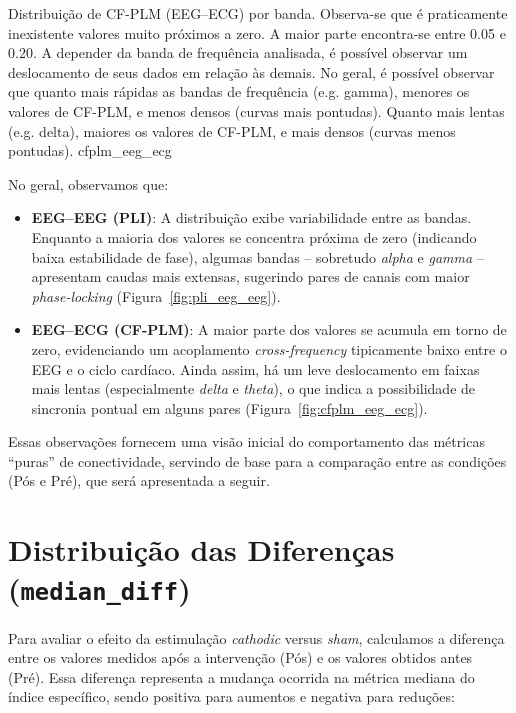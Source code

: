 {Distribuição de CF-PLM (EEG--ECG) por banda. Observa-se que é praticamente inexistente valores muito próximos a zero. A maior parte encontra-se entre 0.05 e 0.20. A depender da banda de frequência analisada, é possível observar um deslocamento de seus dados em relação às demais. No geral, é possível observar que quanto mais rápidas as bandas de frequência (e.g. gamma), menores os valores de CF-PLM, e menos densos (curvas mais pontudas). Quanto mais lentas (e.g. delta), maiores os valores de CF-PLM, e mais densos (curvas menos pontudas).}
{cfplm_eeg_ecg}

No geral, observamos que:
\begin{itemize}
    \item \textbf{EEG--EEG (PLI)}: A distribuição exibe variabilidade entre as bandas. Enquanto a maioria dos valores se concentra próxima de zero (indicando baixa estabilidade de fase), algumas bandas -- sobretudo \emph{alpha} e \emph{gamma} -- apresentam caudas mais extensas, sugerindo pares de canais com maior \emph{phase-locking} (Figura~\ref{fig:pli_eeg_eeg}).
    \item \textbf{EEG--ECG (CF-PLM)}: A maior parte dos valores se acumula em torno de zero, evidenciando um acoplamento \textit{cross-frequency} tipicamente baixo entre o EEG e o ciclo cardíaco. Ainda assim, há um leve deslocamento em faixas mais lentas (especialmente \emph{delta} e \emph{theta}), o que indica a possibilidade de sincronia pontual em alguns pares (Figura~\ref{fig:cfplm_eeg_ecg}).
\end{itemize}

Essas observações fornecem uma visão inicial do comportamento das métricas ``puras'' de conectividade, servindo de base para a comparação entre as condições (Pós e Pré), que será apresentada a seguir.

\section{Distribuição das Diferenças (\texttt{median\_diff})}
Para avaliar o efeito da estimulação \textit{cathodic} versus \textit{sham}, calculamos a diferença entre os valores medidos após a intervenção (Pós) e os valores obtidos antes (Pré). Essa diferença representa a mudança ocorrida na métrica mediana do índice específico, sendo positiva para aumentos e negativa para reduções:

